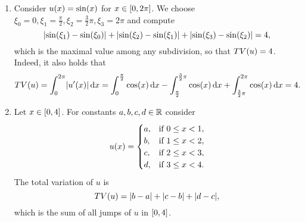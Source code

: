 \begin{example}
	\begin{enumerate}
		\item Consider \(u\parentheses*{x} = \sin\parentheses*{x}\) for \(x \in \brackets*{0, 2\pi}\).
		We choose \(\xi_0 = 0, \xi_1 = \frac{\pi}{2}, \xi_2 = \frac{3}{2}\pi, \xi_3 = 2\pi\) and compute
		\[
			\absolute*{\sin\parentheses*{\xi_1} - \sin\parentheses*{\xi_0}} + \absolute*{\sin\parentheses*{\xi_2} - \sin\parentheses*{\xi_1}} + \absolute*{\sin\parentheses*{\xi_3} - \sin\parentheses*{\xi_2}} = 4,
		\]
		which is the maximal value among any subdivision, so that \(TV\parentheses*{u} = 4\).
		Indeed, it also holds that
		\[
			TV\parentheses*{u} = \int_0^{2\pi}\absolute*{u'\parentheses*{x}}\d x = \int_0^{\frac{\pi}{2}}\cos\parentheses*{x}\d x - \int_{\frac{\pi}{2}}^{\frac{3}{2}\pi}\cos\parentheses*{x}\d x + \int_{\frac{3}{2}\pi}^{2\pi}\cos\parentheses*{x}\d x = 4.
		\]
		\item Let \(x \in \brackets*{0, 4}\).
		For constants \(a, b, c, d \in \R\) consider
		\[
			u\parentheses*{x} = \begin{cases}
				a, & \text{if }0 \le x < 1,\\
				b, & \text{if }1 \le x < 2,\\
				c, & \text{if }2 \le x < 3,\\
				d, & \text{if }3 \le x < 4.
			\end{cases}
		\]
		The total variation of \(u\) is
		\[
			TV\parentheses*{u} = \absolute*{b - a} + \absolute*{c - b} + \absolute*{d - c},
		\]
		which is the sum of all jumps of \(u\) in \(\brackets*{0, 4}\).
	\end{enumerate}
\end{example}
